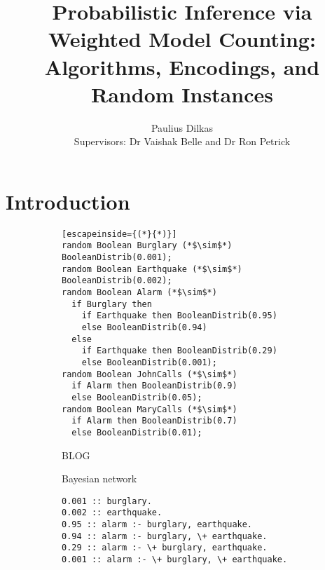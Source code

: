 \documentclass{article}
\title{Probabilistic Inference via Weighted Model Counting: Algorithms,
  Encodings, and Random Instances}
\author{Paulius Dilkas \\[1ex] {\small Supervisors: Dr Vaishak Belle and Dr Ron
    Petrick}}
\affil{School of Informatics, University of Edinburgh}
\begin{document}
\maketitle

\section{Introduction}

\begin{figure}
  \centering
  \begin{subfigure}{0.59\textwidth}
    \centering
    \begin{lstlisting}[escapeinside={(*}{*)}]
random Boolean Burglary (*$\sim$*) BooleanDistrib(0.001);
random Boolean Earthquake (*$\sim$*) BooleanDistrib(0.002);
random Boolean Alarm (*$\sim$*)
  if Burglary then
    if Earthquake then BooleanDistrib(0.95)
    else BooleanDistrib(0.94)
  else
    if Earthquake then BooleanDistrib(0.29)
    else BooleanDistrib(0.001);
random Boolean JohnCalls (*$\sim$*)
  if Alarm then BooleanDistrib(0.9)
  else BooleanDistrib(0.05);
random Boolean MaryCalls (*$\sim$*)
  if Alarm then BooleanDistrib(0.7)
  else BooleanDistrib(0.01);
    \end{lstlisting}
    \caption{BLOG}
    \label{fig:blog}
  \end{subfigure}
  \begin{subfigure}{0.40\textwidth}
    \centering
    \caption{Bayesian network}
    \label{fig:bn}
  \end{subfigure}
  \begin{subfigure}{0.59\textwidth}
    \centering
    \begin{lstlisting}
0.001 :: burglary.
0.002 :: earthquake.
0.95 :: alarm :- burglary, earthquake.
0.94 :: alarm :- burglary, \+ earthquake.
0.29 :: alarm :- \+ burglary, earthquake.
0.001 :: alarm :- \+ burglary, \+ earthquake.

\end{lstlisting}
\end{subfigure}
\end{figure}
\end{document}
